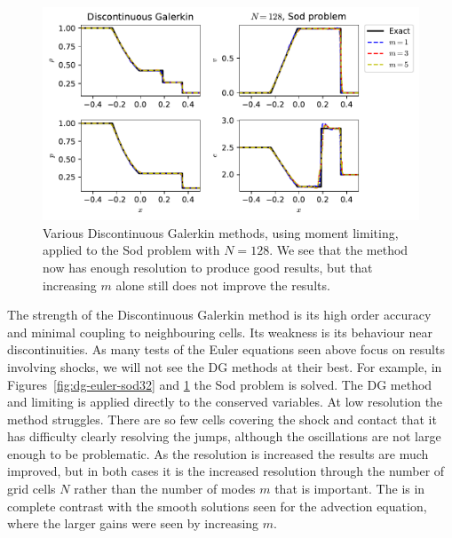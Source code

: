 \begin{figure}[t]
\centering
\includegraphics[width=0.8\linewidth]{dg_sod_128}
\caption[Discontinuous Galerkin methods applied to the Sod problem, high resolution]
{\label{fig:dg-euler-sod128} Various Discontinuous Galerkin methods, using moment
limiting, applied to the Sod problem with $N=128$. We see that the method
now has enough resolution to produce good results, but that increasing $m$ alone
still does not improve the results.\\
}
\end{figure}
%

The strength of the Discontinuous Galerkin method is its high order accuracy and
minimal coupling to neighbouring cells. Its weakness is its behaviour near
discontinuities. As many tests of the Euler equations seen above focus on
results involving shocks, we will not see the DG methods at their best. For
example, in Figures~\ref{fig:dg-euler-sod32} and \ref{fig:dg-euler-sod128} the
Sod problem is solved. The DG method and limiting is applied directly to the
conserved variables. At low resolution the method struggles. There are so few
cells covering the shock and contact that it has difficulty clearly resolving
the jumps, although the oscillations are not large enough to be problematic. As
the resolution is increased the results are much improved, but in both cases it
is the increased resolution through the number of grid cells $N$ rather than the
number of modes $m$ that is important. The is in complete contrast with the
smooth solutions seen for the advection equation, where the larger gains were
seen by increasing $m$.

